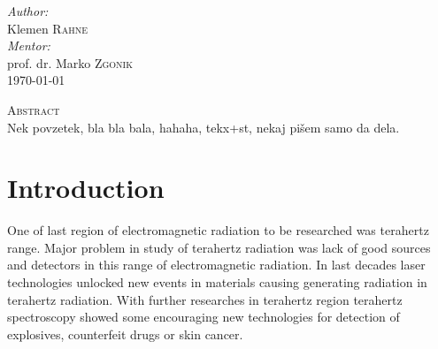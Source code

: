 \documentclass[english,11pt,a4paper]{article}
\numberwithin{equation}{section} %
\numberwithin{figure}{section} %
\numberwithin{table}{section} %
\begin{document}
\begin{titlepage}


\Large \emph{Author:}\\
Klemen \textsc{Rahne}\\[1cm]

\Large \emph{Mentor:}\\
prof. dr. Marko \textsc{Zgonik}\\[1cm]






{\large \today } \\[0.5cm] %

	

\vfill
\begin{center}
\textsc {Abstract}\\[0.5cm]

Nek povzetek, bla bla bala, hahaha, tekx+st, nekaj pišem samo da dela.

\end{center}
\end{titlepage}



\tableofcontents



\section{Introduction}

One of last region of electromagnetic radiation to be researched was terahertz range. Major problem in study of terahertz radiation was lack of good sources and detectors in this range of electromagnetic radiation. In last decades laser technologies unlocked new events in materials causing generating radiation in terahertz radiation. With further researches in terahertz region terahertz spectroscopy showed some encouraging new technologies for detection of explosives, counterfeit drugs or skin cancer.
\end{document}
